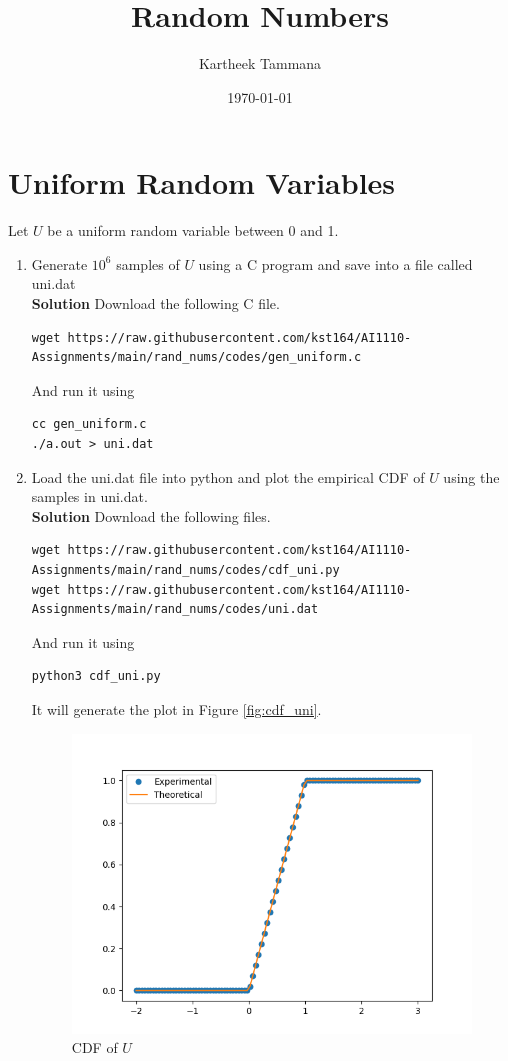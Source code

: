 \documentclass[journal, 12pt, twocolumn]{IEEEtran}
\title{Random Numbers}
\author{Kartheek Tammana}
\date{\today}
\begin{document}
\section{Uniform Random Variables}
Let $U$ be a uniform random variable between 0 and 1.
\begin{enumerate}[label=\arabic{section}.\arabic*]
    \item
        Generate $10^6$ samples of $U$ using a C program and save into a file called uni.dat
        \\
        \textbf{Solution} Download the following C file.
        \begin{lstlisting}
wget https://raw.githubusercontent.com/kst164/AI1110-Assignments/main/rand_nums/codes/gen_uniform.c
        \end{lstlisting}
        And run it using
        \begin{lstlisting}
cc gen_uniform.c
./a.out > uni.dat
        \end{lstlisting}

    \item
        Load the uni.dat file into python and plot the empirical CDF of $U$ using the samples in uni.dat.
        \\
        \textbf{Solution} Download the following files.
        \begin{lstlisting}
wget https://raw.githubusercontent.com/kst164/AI1110-Assignments/main/rand_nums/codes/cdf_uni.py
wget https://raw.githubusercontent.com/kst164/AI1110-Assignments/main/rand_nums/codes/uni.dat
        \end{lstlisting}
        And run it using
        \begin{lstlisting}
python3 cdf_uni.py
        \end{lstlisting}
        It will generate the plot in Figure \eqref{fig:cdf_uni}.
        \begin{figure}[!ht]
            \includegraphics[width=\columnwidth]{figs/cdf_uni.png}
            \caption{CDF of $U$}
            \label{fig:cdf_uni}
        \end{figure}


\end{enumerate}
\end{document}
